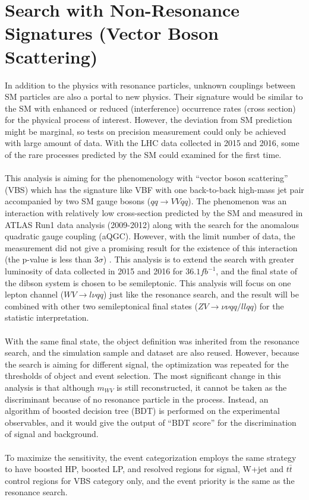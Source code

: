 \chapter{Search with Non-Resonance Signatures (Vector Boson Scattering)}
\label{chap:VBFStrategy}
\noindent
In addition to the physics with resonance particles, unknown couplings between SM particles are also a portal to new physics. Their signature would be similar to the SM with enhanced or reduced (interference) occurrence rates (cross section) for the physical process of interest. However, the deviation from SM prediction might be marginal, so tests on precision measurement could only be achieved with large amount of data. With the LHC data collected in 2015 and 2016, some of the rare processes predicted by the SM could examined for the first time.
\\
\\This analysis is aiming for the phenomenology with ``vector boson scattering'' (VBS) which has the signature like VBF with one back-to-back high-mass jet pair accompanied by two SM gauge bosons ($qq \to VVqq$). The phenomenon was an interaction with relatively low cross-section predicted by the SM and measured in ATLAS Run1 data analysis (2009-2012) along with the search for the anomalous quadratic gauge coupling (aQGC). However, with the limit number of data, the measurement did not give a promising result for the existence of this interaction (the p-value is less than $3\sigma$) \cite{STDM-2014-05}. This analysis is to extend the search with greater luminosity of data collected in 2015 and 2016 for $36.1fb^{-1}$, and the final state of the dibson system is chosen to be semileptonic. This analysis will focus on one lepton channel ($WV \to l\nu qq$) just like the resonance search, and the result will be combined with other two semileptonical final states ($ZV \to \nu\nu qq/llqq$) for the statistic interpretation.
\\
\\With the same final state, the object definition was inherited from the resonance search, and the simulation sample and dataset are also reused. However, because the search is aiming for different signal, the optimization was repeated for the thresholds of object and event selection.  The most significant change in this analysis is that although $m_{WV}$ is still reconstructed, it cannot be taken as the discriminant because of no resonance particle in the process. Instead, an algorithm of boosted decision tree (BDT) is performed on the experimental observables, and it would give the output of ``BDT score'' for the discrimination of signal and background.
\\ 
\\To maximize the sensitivity, the event categorization employs the same strategy to have boosted HP, boosted LP, and resolved regions for signal, W+jet and $t\bar{t}$ control regions for VBS category only, and the event priority is the same as the resonance search.
